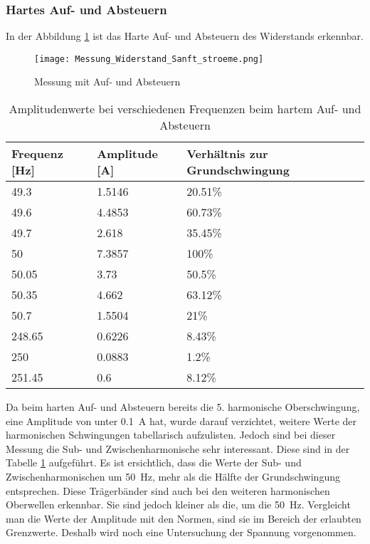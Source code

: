 \newpage
\subsubsection*{Hartes Auf- und Absteuern}

In der Abbildung \ref{fig:Mess_Widerstand_Sanft_stroeme} ist das Harte Auf- und Absteuern des Widerstands erkennbar. 

\begin{figure}[ht!]
	\centering
	\texttt{[image: Messung\_Widerstand\_Sanft\_stroeme.png]}	
	\caption{Messung mit Auf- und Absteuern}\label{fig:Mess_Widerstand_Sanft_stroeme}
\end{figure}


\begin{table}[ht!]
	\centering
	\begin{tabular}{|l|l|l|}
		\hline
		Frequenz {[}Hz{]} & Amplitude {[}A{]} & Verhältnis zur Grundschwingung	\\ \hline
		49.3              & 1.5146            & 20.51\%							\\ \hline
		49.6              & 4.4853            & 60.73\%							\\ \hline
		49.7              & 2.618             & 35.45\%							\\ \hline
		50                & 7.3857            & 100\%							\\ \hline
		50.05             & 3.73              & 50.5\%							\\ \hline
		50.35             & 4.662             & 63.12\%							\\ \hline
		50.7              & 1.5504            & 21\%							\\ \hline
		248.65            & 0.6226            & 8.43\%							\\ \hline
		250               & 0.0883            & 1.2\%							\\ \hline
		251.45            & 0.6               & 8.12\%							\\ \hline
	\end{tabular}
	\caption{Amplitudenwerte bei verschiedenen Frequenzen beim hartem Auf- und Absteuern}\label{tab:Sanft_stroeme}
\end{table}
Da beim harten Auf- und Absteuern bereits die 5. harmonische Oberschwingung, eine Amplitude von unter \SI{0.1}{A} hat, wurde darauf verzichtet, weitere Werte der harmonischen Schwingungen tabellarisch aufzulisten. Jedoch sind bei dieser Messung die Sub- und Zwischenharmonische sehr interessant. Diese sind in der Tabelle \ref{tab:Sanft_stroeme} aufgeführt. Es ist ersichtlich, dass die Werte der Sub- und Zwischenharmonischen um \SI{50}{Hz}, mehr als die Hälfte der Grundschwingung entsprechen. Diese Trägerbänder sind auch bei den weiteren harmonischen Oberwellen erkennbar. Sie sind jedoch kleiner als die, um die \SI{50}{Hz}. Vergleicht man die Werte der Amplitude mit den Normen, sind sie im Bereich der erlaubten Grenzwerte. Deshalb wird noch eine Untersuchung der Spannung vorgenommen.


